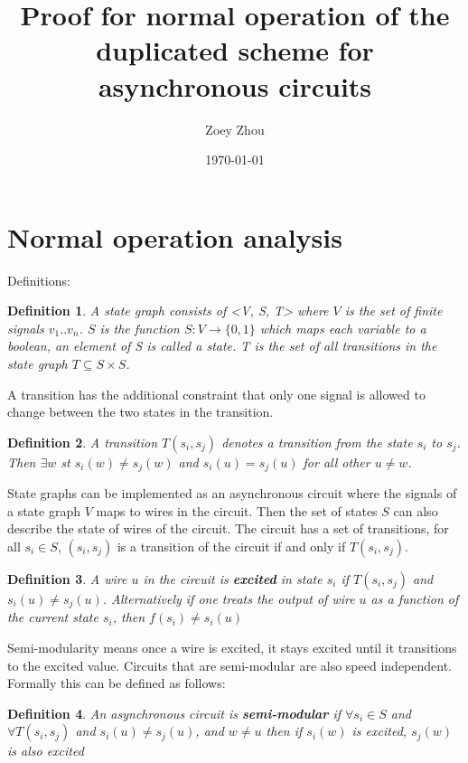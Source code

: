 \documentclass{article}
\title{Proof for normal operation of the duplicated scheme for asynchronous circuits}
\author{Zoey Zhou}
\date{\today}
\newtheorem*{definition}{Definition}
\begin{document}
\section{Normal operation analysis}
Definitions:  
\begin{definition}A state graph consists of <V, S, T> where $V$ is the set of finite signals $v_1 .. v_n$.  $S$ is the function $S: V \to \{0,1\}$ %
which maps each variable to a boolean, an element of S is called a state. T is the set of all transitions in the state graph $T \subseteq S \times S$.  \end{definition}

A transition has the additional constraint that only one signal is allowed to change between the two states in the transition.
\begin{definition}A transition $T(s_i, s_j)$ denotes a transition from the state $s_i$ to $s_j$.  Then $\exists w$ st $s_i(w)\neq s_j(w)$ and $s_i(u)=s_j(u)$ for all other $u \neq w$. 
\end{definition}

State graphs can be implemented as an asynchronous circuit where the signals of a state graph $V$ maps to wires in the circuit. %
Then the set of states $S$ can also describe the state of wires of the circuit.  The circuit has a set of transitions, for all $s_i \in S$, $(s_i, s_j)$ is a transition of the circuit if and only if $T(s_i, s_j)$.%
\begin{definition}A wire $u$ in the circuit is \textbf{excited} in state $s_i$ if $T(s_i,s_j)$ and $s_i(u) \neq s_j(u)$.  Alternatively if one treats the output of wire $u$ as a function of the current state $s_i$, then $f(s_i)\neq s_i(u)$\end{definition}

Semi-modularity means once a wire is excited, it stays excited until it transitions to the excited value.  Circuits that are semi-modular are also speed independent.  Formally this can be defined as follows:
\begin{definition}An asynchronous circuit is \textbf{semi-modular} if $\forall s_i \in S$ and $\forall T(s_i,s_j)$ and $s_i(u) \neq s_j(u)$, and $w\neq u$ then if $s_i(w)$ is excited, $s_j(w)$ is also excited \end{definition}
\end{document}
